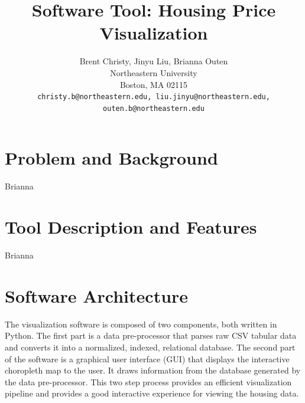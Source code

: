 \documentclass{article}
\title{Software Tool: Housing Price Visualization}
\author{%
  Brent Christy, Jinyu Liu, Brianna Outen \\
  Northeastern University\\
  Boston, MA 02115 \\
  \texttt{christy.b@northeastern.edu, liu.jinyu@northeastern.edu,} \\
  \texttt{outen.b@northeastern.edu} \\
}
\begin{document}
\maketitle

\section{Problem and Background}
Brianna

\section{Tool Description and Features}
Brianna


\section{Software Architecture}
The visualization software is composed of two components, both written in Python. The first 
part is a data pre-processor that parses raw CSV tabular data and converts it into
a normalized, indexed, relational database. The second part of the software is a graphical user interface (GUI) that 
displays the interactive choropleth map to the user. It draws information 
from the database generated by the data pre-processor. This two step process provides an
efficient visualization pipeline and provides a good interactive experience for viewing the housing data.
\end{document}
